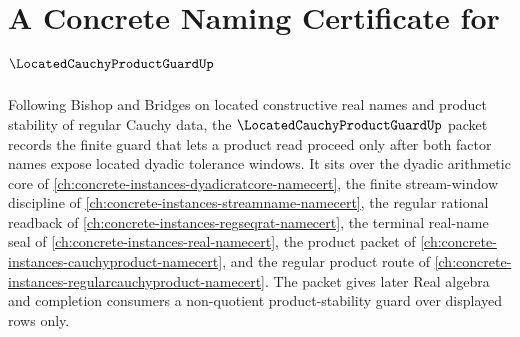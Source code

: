 \chapter{A Concrete Naming Certificate for $\LocatedCauchyProductGuardUp$}
\label{ch:concrete-instances-located-cauchy-product-guard-namecert}

Following Bishop and Bridges on located constructive real names and product stability of regular Cauchy data, the $\LocatedCauchyProductGuardUp$ packet records the finite guard that lets a product read proceed only after both factor names expose located dyadic tolerance windows. It sits over the dyadic arithmetic core of \autoref{ch:concrete-instances-dyadicratcore-namecert}, the finite stream-window discipline of \autoref{ch:concrete-instances-streamname-namecert}, the regular rational readback of \autoref{ch:concrete-instances-regseqrat-namecert}, the terminal real-name seal of \autoref{ch:concrete-instances-real-namecert}, the product packet of \autoref{ch:concrete-instances-cauchyproduct-namecert}, and the regular product route of \autoref{ch:concrete-instances-regularcauchyproduct-namecert}. The packet gives later Real algebra and completion consumers a non-quotient product-stability guard over displayed rows only.

